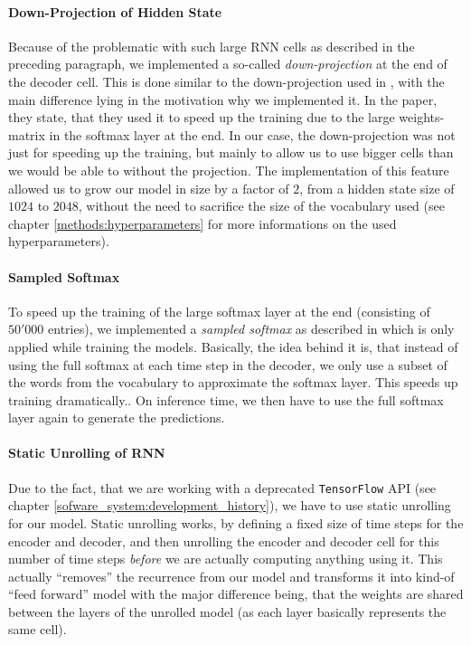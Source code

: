 \paragraph{Down-Projection of Hidden State} Because of the problematic with such large RNN cells as described in the preceding paragraph, we implemented a so-called \emph{down-projection} at the end of the decoder cell. This is done similar to the down-projection used in \cite{Vinyals:2015}, with the main difference lying in the motivation why we implemented it. In the paper, they state, that they used it to speed up the training due to the large weights-matrix in the softmax layer at the end. In our case, the down-projection was not just for speeding up the training, but mainly to allow us to use bigger cells than we would be able to without the projection. The implementation of this feature allowed us to grow our model in size by a factor of $2$, from a hidden state size of $1024$ to $2048$, without the need to sacrifice the size of the vocabulary used (see chapter \ref{methods:hyperparameters} for more informations on the used hyperparameters).

\paragraph{Sampled Softmax} To speed up the training of the large softmax layer at the end (consisting of $50'000$ entries), we implemented a \emph{sampled softmax} as described in \cite{Sebastien:2014} which is only applied while training the models. Basically, the idea behind it is, that instead of using the full softmax at each time step in the decoder, we only use a subset of the words from the vocabulary to approximate the softmax layer. This speeds up training dramatically.. On inference time, we then have to use the full softmax layer again to generate the predictions.

\paragraph{Static Unrolling of RNN} Due to the fact, that we are working with a deprecated \texttt{TensorFlow} API (see chapter \ref{sofware_system:development_history}), we have to use static unrolling for our model. Static unrolling works, by defining a fixed size of time steps for the encoder and decoder, and then unrolling the encoder and decoder cell for this number of time steps \emph{before} we are actually computing anything using it. This actually ``removes'' the recurrence from our model and transforms it into kind-of ``feed forward'' model with the major difference being, that the weights are shared between the layers of the unrolled model (as each layer basically represents the same cell).

